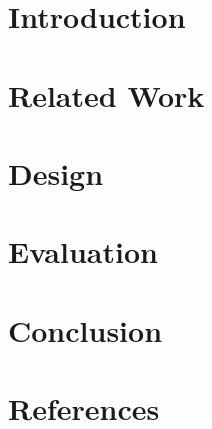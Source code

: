 \documentclass[twoside]{article}
\begin{document}
	\begin{multicols}{2} %
		
		\section{Introduction}
		
		
		
		\section{Related Work}
		
		
		
		\section{Design}
		
		
		\section{Evaluation}
		
		
		\section{Conclusion}
		
		
		\section{References}
		
		
		

		
		
	\end{multicols}
	
\end{document}

